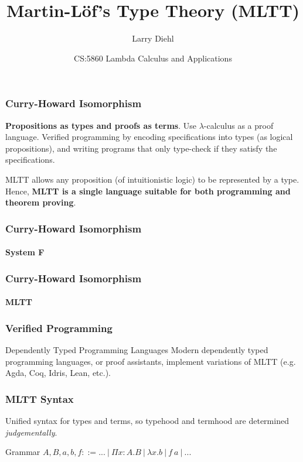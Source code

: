 \documentclass[mathserif]{beamer}
\title{Martin-L{\"o}f's Type Theory (MLTT)}
\author{Larry Diehl}
\institute{University of Iowa - Guest Lecture}
\date[April 26, 2018]
{CS:5860 Lambda Calculus and Applications}
\newcommand{\Funv}[3]{\ensuremath{\Pi #1{:}#2. #3}}
\newcommand{\Fun}[2]{\Funv{x}{#1}{#2}}
\newcommand{\funv}[2]{\ensuremath{\lambda #1. #2}}
\newcommand{\fun}[1]{\funv{x}{#1}}
\newcommand{\app}[2]{\ensuremath{#1~#2}}
\begin{document}
\frame{\titlepage}

\begin{frame}
\frametitle{Curry-Howard Isomorphism}

\textbf{Propositions as types and proofs as terms}.
Use $\lambda$-calculus as a proof language.
Verified programming by encoding specifications
into types (as logical propositions), and
writing programs that only type-check if they
satisfy the specifications.

MLTT allows any proposition (of intuitionistic logic)
to be represented by a type.
Hence, \textbf{MLTT is a single language
suitable for both programming and theorem proving}.

\end{frame}

\begin{frame}
\frametitle{Curry-Howard Isomorphism}
\framesubtitle{System F}

\end{frame}

\begin{frame}
\frametitle{Curry-Howard Isomorphism}
\framesubtitle{MLTT}

\end{frame}

\begin{frame}
\frametitle{Verified Programming}

\begin{block}{Dependently Typed Programming Languages}
Modern dependently typed programming languages, or proof assistants,
implement variations of MLTT (e.g. Agda, Coq, Idris, Lean, etc.).
\end{block}

\end{frame}

\begin{frame}
\frametitle{MLTT Syntax}

Unified syntax for types and terms,
so typehood and termhood are determined \textit{judgementally}.

\begin{block}{Grammar}
$A,B,a,b,f ::= ...~|~\Fun{A}{B}~|~\fun{b}~|~\app{f}{a}~|~...$
\end{block}

\end{frame}
\end{document}
